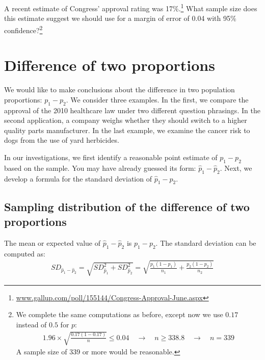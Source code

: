 \begin{exercise}
A recent estimate of Congress' approval rating was 17\%.\footnote{\href{http://www.gallup.com/poll/155144/Congress-Approval-June.aspx}{www.gallup.com/poll/155144/Congress-Approval-June.aspx}} What sample size does this estimate suggest we should use for a margin of error of 0.04 with 95\% confidence?\footnote{We complete the same computations as before, except now we use $0.17$ instead of $0.5$ for $p$:
\begin{align*}
1.96\times \sqrt{\frac{0.17(1-0.17)}{n}} \leq 0.04
\quad\rightarrow\quad
n \geq 338.8
\quad\rightarrow\quad
n = 339
\end{align*}
A sample size of 339 or more would be reasonable.}


\end{exercise}


\section{Difference of two proportions}
\label{differenceOfTwoProportions}

We would like to make conclusions about the difference in two population proportions: $p_1 - p_2$. We consider three examples. In the first, we compare the approval of the 2010 healthcare law under two different question phrasings. In the second application, a company weighs whether they should switch to a higher quality parts manufacturer. In the last example, we examine the cancer risk to dogs from the use of yard herbicides.

In our investigations, we first identify a reasonable point estimate of $p_1 - p_2$ based on the sample. You may have already guessed its form: $\hat{p}_1 - \hat{p}_2$. Next, we develop a formula for the standard deviation of $\hat{p}_1 - \hat{p}_2$.


\subsection{Sampling distribution of the difference of two proportions}

The mean or expected value of $\hat{p}_1 - \hat{p}_2$ is $p_1 - p_2$. The standard deviation can be computed as:
\begin{align*}
SD_{\hat{p}_1 - \hat{p}_2}
	= \sqrt{SD_{\hat{p}_1}^2 + SD_{\hat{p}_2}^2} 
	= \sqrt{\frac{p_1(1-p_1)}{n_1} + \frac{p_2(1-p_2)}{n_2}}
\end{align*}

